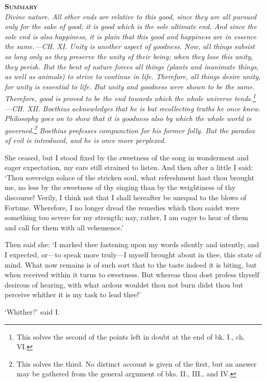 \documentclass[12pt]{book}
\newenvironment{abstract}%
  {\noindent \textbf{\scshape Summary} \\ \rightskip1in\itshape\small}%
  {\bigskip}
\begin{document}
\begin{abstract}
     Divine nature. All other ends are relative to this good, since they
     are all pursued only for the sake of good; it is \emph{good} which is
     the sole ultimate end. And since the sole end is also happiness, it
     is plain that this good and happiness are in essence the same.---CH.
     XI. Unity is another aspect of goodness. Now, all things subsist so
     long only as they preserve the unity of their being; when they lose
     this unity, they perish. But the bent of nature forces all things
     (plants and inanimate things, as well as animals) to strive to
     continue in life. Therefore, all things desire unity, for unity is
     essential to life. But unity and goodness were shown to be the
     same. Therefore, good is proved to be the end towards which the
     whole universe tends.\footnote{This solves the second of the points left in doubt at the end of bk. I., ch. VI.}---CH. XII. Boethius acknowledges that he is
     but recollecting truths he once knew. Philosophy goes on to show
     that it is goodness also by which the whole world is governed.\footnote{This solves the third. No distinct account is given of the first, but an answer may be gathered from the general argument of bks. II., III., and IV.}
     Boethius professes compunction for his former folly. But the
     paradox of evil is introduced, and he is once more perplexed.
\end{abstract}

She ceased, but I stood fixed by the sweetness of the song in wonderment
and eager expectation, my ears still strained to listen. And then after
a little I said: `Thou sovereign solace of the stricken soul, what
refreshment hast thou brought me, no less by the sweetness of thy
singing than by the weightiness of thy discourse! Verily, I think not
that I shall hereafter be unequal to the blows of Fortune. Wherefore, I
no longer dread the remedies which thou saidst were something too severe
for my strength; nay, rather, I am eager to hear of them and call for
them with all vehemence.'

Then said she: `I marked thee fastening upon my words silently and
intently, and I expected, or---to speak more truly---I myself brought
about in thee, this state of mind. What now remains is of such sort that
to the taste indeed it is biting, but when received within it turns to
sweetness. But whereas thou dost profess thyself desirous of hearing,
with what ardour wouldst thou not burn didst thou but perceive whither
it is my task to lead thee!'

`Whither?' said I.
\end{document}
